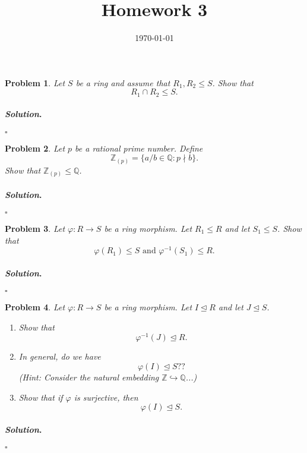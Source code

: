 \documentclass[reqno]{amsart}
\theoremstyle{plain}
\newtheorem{problem}{Problem}
\theoremstyle{definition}
\newenvironment{solution}{\paragraph{\emph{Solution}.}}{\hfill$\square$}
\begin{document}
 

\title[Homework 3]{Homework 3}

\date{\today} 
\maketitle 


\begin{problem}
Let $S$ be a ring and assume that $R_{1}, R_{2} \le S$.  Show that
$$R_{1} \cap R_{2} \le S. $$
\end{problem}
\begin{solution}

\end{solution}

\begin{problem}
Let $p$ be a rational prime number.  Define
$$\mathbb{Z}_{(p)} = \{ a/b \in \mathbb{Q} : p \nmid b\}. $$
Show that $\mathbb{Z}_{(p)} \le \mathbb{Q}$.
\end{problem}
\begin{solution}

\end{solution}

\begin{problem}
Let $\varphi:R \rightarrow S$ be a ring morphism.  Let $R_{1} \le R$ and let $S_{1} \le S$.  Show that
$$\varphi(R_{1}) \le S \text{ and } \varphi^{-1}(S_{1}) \le R. $$
\end{problem}
\begin{solution}

\end{solution}

\begin{problem}
Let $\varphi:R \rightarrow S$ be a ring morphism.  Let $I \trianglelefteq R$ and let $J \trianglelefteq S$.  
\begin{enumerate}
\item Show that
$$\varphi^{-1}(J) \trianglelefteq R. $$
\item In general, do we have
$$\varphi(I) \trianglelefteq S?? $$
(Hint:  Consider the natural embedding $\mathbb{Z} \hookrightarrow \mathbb{Q}$...)
\item Show that if $\varphi$ is surjective, then
$$\varphi(I) \trianglelefteq S. $$
\end{enumerate}
\end{problem}
\begin{solution}

\end{solution}
\end{document}
